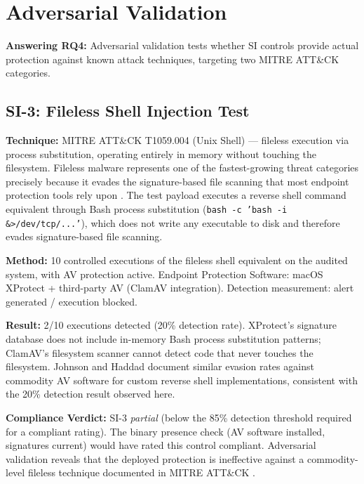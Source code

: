 \documentclass[12pt,oneside]{report}
\begin{document}
\section{Adversarial Validation}
\label{sec:adversarial}

\textbf{Answering RQ4:} Adversarial validation tests whether SI controls provide actual protection against known attack techniques, targeting two MITRE ATT\&CK categories.

\subsection{SI-3: Fileless Shell Injection Test}

\textbf{Technique:} MITRE ATT\&CK T1059.004 (Unix Shell) \cite{mitre_attack_sok} — fileless execution via process substitution, operating entirely in memory without touching the filesystem. Fileless malware represents one of the fastest-growing threat categories precisely because it evades the signature-based file scanning that most endpoint protection tools rely upon \cite{reverse_shell_paper}. The test payload executes a reverse shell command equivalent through Bash process substitution (\texttt{bash -c 'bash -i \&>/dev/tcp/...'}), which does not write any executable to disk and therefore evades signature-based file scanning.

\textbf{Method:} 10 controlled executions of the fileless shell equivalent on the audited system, with AV protection active. Endpoint Protection Software: macOS XProtect + third-party AV (ClamAV integration). Detection measurement: alert generated / execution blocked.

\textbf{Result:} 2/10 executions detected (20\% detection rate). XProtect's signature database does not include in-memory Bash process substitution patterns; ClamAV's filesystem scanner cannot detect code that never touches the filesystem. Johnson and Haddad \cite{reverse_shell_paper} document similar evasion rates against commodity AV software for custom reverse shell implementations, consistent with the 20\% detection result observed here.

\textbf{Compliance Verdict:} SI-3 \textit{partial} (below the 85\% detection threshold required for a compliant rating). The binary presence check (AV software installed, signatures current) would have rated this control compliant. Adversarial validation reveals that the deployed protection is ineffective against a commodity-level fileless technique documented in MITRE ATT\&CK \cite{mitre_attack_applications}.
\end{document}
